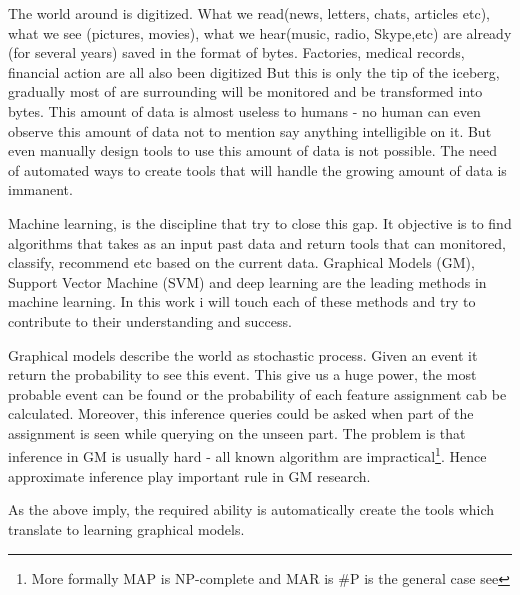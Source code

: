 The world around is digitized.
What we read(news, letters, chats, articles etc), what we see (pictures, movies), what we hear(music, radio, Skype,etc) are already (for several years) saved in the format of bytes.
Factories, medical records, financial action are all also been digitized
But this is only the tip of the iceberg, gradually most of are surrounding will be monitored and be transformed into  bytes.
This amount of data is almost useless to humans - no human can even observe this amount of data not to mention say anything intelligible on it.
But even manually design tools to use this amount of data is not possible.
The need of automated ways to create tools that will handle the growing amount of data is immanent.   

Machine learning, is the discipline that try to close this gap.
It objective is to find algorithms that takes as an input past data and return tools that can monitored, classify, recommend etc based on the current data.
Graphical Models (GM), Support Vector Machine (SVM) and deep learning are the leading methods in machine learning.
In this work i will touch each of these methods and try to contribute to their understanding and success.

Graphical models describe the world as stochastic process.
Given an event it return the probability to see this event.
This give us a huge power, the most probable event can be found or the probability of each feature assignment cab be calculated.
Moreover, this inference queries could be asked when part of the assignment is seen while querying on the unseen part.
The problem is that inference in GM is usually hard - all known algorithm are impractical\footnote{More formally MAP is NP-complete and MAR is \#P is the general case see }.
Hence approximate inference play important rule in GM research.

As the above imply, the required ability is automatically create  the tools which translate to learning graphical models.


 
